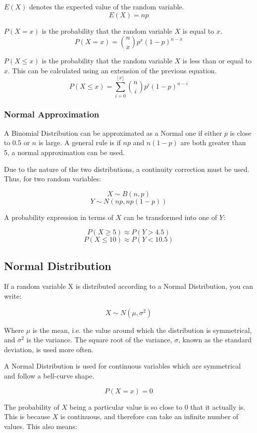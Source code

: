 \documentclass{article}
\begin{document}
$E(X)$ denotes the expected value of the random variable.
$$ E(X) = np $$

$P(X = x)$ is the probability that the random variable $X$ is equal to $x$.
$$ P(X = x) = {n \choose x}p^x(1-p)^{n-x} $$

$P(X \leq x)$ is the probability that the random variable $X$ is less than or equal to $x$.
This can be calculated using an extension of the previous equation.
$$ P(X \leq x) = \sum_{i=0}^{\lfloor x \rfloor}{n \choose i}p^i(1-p)^{n-i} $$

\subsubsection{Normal Approximation}

A Binomial Distribution can be approximated as a Normal one if either $p$ is close to 0.5
or $n$ is large. A general rule is if $np$ and $n(1-p)$ are both greater than 5, a normal
approximation can be used.

Due to the nature of the two distributions, a continuity correction must be used. Thus, for
two random variables:

$$ X \sim B(n, p) $$
$$ Y \sim N(np, np(1-p)) $$

A probability expression in terms of $X$ can be transformed into one of $Y$:

$$ P(X \geq 5) \approx P(Y > 4.5) $$
$$ P(X \leq 10) \approx P(Y < 10.5) $$

\subsection{Normal Distribution}

If a random variable X is distributed according to a Normal Distribution, you can write:

$$ X \sim N(\mu, \sigma^2) $$

Where $\mu$ is the mean, i.e. the value around which the distribution is symmetrical, and
$\sigma^2$ is the variance. The square root of the variance, $\sigma$, known as the standard
deviation, is used more often.

A Normal Distribution is used for continuous variables which are symmetrical and follow a bell-curve shape.

$$ P(X = x) = 0 $$

The probability of $X$ being a particular value is so close to 0 that it actually is. This
is because $X$ is continuous, and therefore can take an infinite number of values. This also
means:
\end{document}

